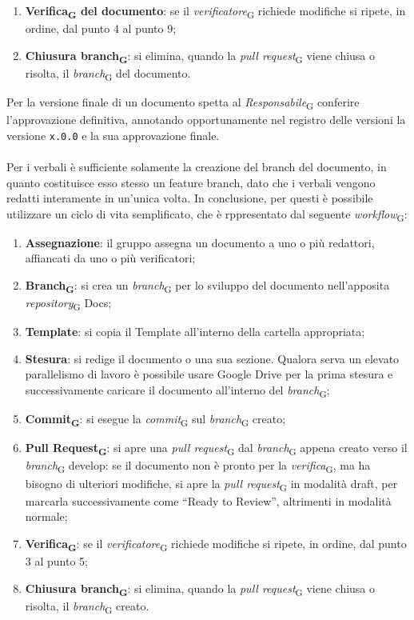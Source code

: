 \begin{enumerate}
    \item \textbf{Verifica\textsubscript{G} del documento}: se il \textit{verificatore}\textsubscript{G} richiede modifiche si ripete, in ordine, dal punto 4 al punto 9;
    \item \textbf{Chiusura branch\textsubscript{G}}: si elimina, quando la \textit{pull request}\textsubscript{G} viene chiusa o risolta, il \textit{branch}\textsubscript{G} del documento.
\end{enumerate}
Per la versione finale di un documento spetta al \textit{Responsabile}\textsubscript{G} conferire l’approvazione definitiva, annotando opportunamente nel registro delle versioni la versione \texttt{x.0.0} e la sua approvazione finale.\\ \\
Per i verbali è sufficiente solamente la creazione del branch del documento, in quanto costituisce esso stesso un feature branch, dato che i verbali vengono redatti interamente in un'unica volta. In conclusione, per questi è possibile utilizzare un ciclo di vita semplificato, che è rppresentato dal seguente \textit{workflow}\textsubscript{G}:
\begin{enumerate}
    \item \textbf{Assegnazione}: il gruppo assegna un documento a uno o più redattori, affiancati da uno o più verificatori;
    \item \textbf{Branch\textsubscript{G}}: si crea un \textit{branch}\textsubscript{G} per lo sviluppo del documento nell’apposita \textit{repository}\textsubscript{G} Docs;
    \item \textbf{Template}: si copia il Template all'interno della cartella appropriata;
    \item \textbf{Stesura}: si redige il documento o una sua sezione. Qualora serva un elevato parallelismo di lavoro è possibile usare Google Drive per la prima stesura e successivamente caricare il documento all’interno del \textit{branch}\textsubscript{G};
    \item \textbf{Commit\textsubscript{G}}: si esegue la \textit{commit}\textsubscript{G} sul \textit{branch}\textsubscript{G} creato;
    \item \textbf{Pull Request\textsubscript{G}}: si apre una \textit{pull request}\textsubscript{G} dal \textit{branch}\textsubscript{G} appena creato verso il \textit{branch}\textsubscript{G} develop: se il documento non è pronto per la \textit{verifica}\textsubscript{G}, ma ha bisogno di ulteriori modifiche, si apre la \textit{pull request}\textsubscript{G} in modalità draft, per marcarla successivamente come “Ready to Review”, altrimenti in modalità normale;
    \item \textbf{Verifica\textsubscript{G}}: se il \textit{verificatore}\textsubscript{G} richiede modifiche si ripete, in ordine, dal punto 3 al punto 5;
    \item \textbf{Chiusura branch\textsubscript{G}}: si elimina, quando la \textit{pull request}\textsubscript{G} viene chiusa o risolta, il \textit{branch}\textsubscript{G} creato.
\end{enumerate}

